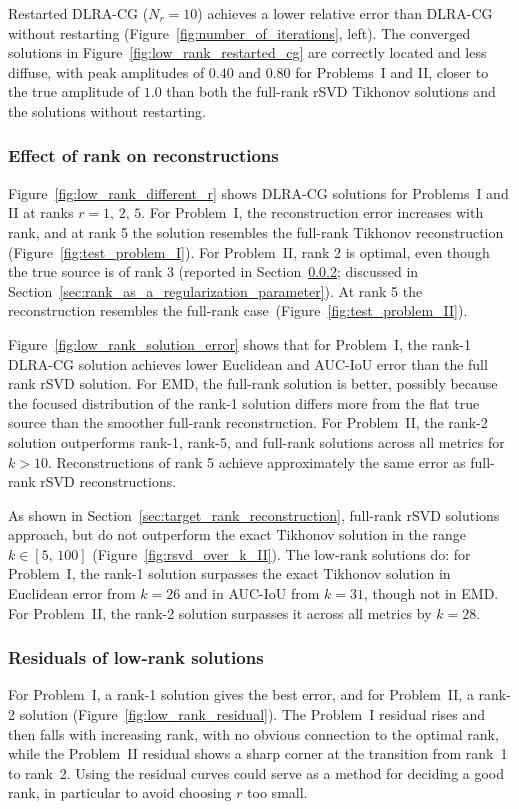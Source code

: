 Restarted DLRA-CG ($N_r = 10$) achieves a lower relative error than DLRA-CG without restarting (Figure~\ref{fig:number_of_iterations}, left). The converged solutions in Figure~\ref{fig:low_rank_restarted_cg} are correctly located and less diffuse, with peak amplitudes of $0.40$ and $0.80$ for Problems~I and II, closer to the true amplitude of $1.0$ than both the full-rank rSVD Tikhonov solutions and the solutions without restarting.


\subsubsection{Effect of rank on reconstructions}\label{sec:effect_of_rank_on_reconstructions}


Figure~\ref{fig:low_rank_different_r} shows DLRA-CG solutions for Problems~I and II at ranks $r = 1,\, 2,\, 5$. For Problem~I, the reconstruction error increases with rank, and at rank 5 the solution resembles the full-rank Tikhonov reconstruction (Figure~\ref{fig:test_problem_I}). For Problem~II, rank 2 is optimal, even though the true source is of rank 3 (reported in Section~\ref{sec:residuals_of_low_rank_solutions}; discussed in Section~\ref{sec:rank_as_a_regularization_parameter}). At rank 5 the reconstruction resembles the full-rank case~(Figure~\ref{fig:test_problem_II}).

Figure~\ref{fig:low_rank_solution_error} shows that for Problem~I, the rank-1 DLRA-CG solution achieves lower Euclidean and AUC-IoU error than the full rank rSVD solution. For EMD, the full-rank solution is better, possibly because the focused distribution of the rank-1 solution differs more from the flat true source than the smoother full-rank reconstruction. For Problem~II, the rank-2 solution outperforms rank-1, rank-5, and full-rank solutions across all metrics for $k > 10$. Reconstructions of rank 5 achieve approximately the same error as full-rank rSVD reconstructions.

As shown in Section~\ref{sec:target_rank_reconstruction}, full-rank rSVD solutions approach, but do not outperform the exact Tikhonov solution in the range $k \in [5,\,100]$ (Figure~\ref{fig:rsvd_over_k_II}). The low-rank solutions do: for Problem~I, the rank-1 solution surpasses the exact Tikhonov solution in Euclidean error from $k = 26$ and in AUC-IoU from $k = 31$, though not in EMD. For Problem~II, the rank-2 solution surpasses it across all metrics by $k = 28$.


\subsubsection{Residuals of low-rank solutions}\label{sec:residuals_of_low_rank_solutions}

For Problem~I, a rank-1 solution gives the best error, and for Problem~II, a rank-2 solution (Figure~\ref{fig:low_rank_residual}). The Problem~I residual rises and then falls with increasing rank, with no obvious connection to the optimal rank, while the Problem~II residual shows a sharp corner at the transition from rank~1 to rank~2. Using the residual curves could serve as a method for deciding a good rank, in particular to avoid choosing $r$ too small.


